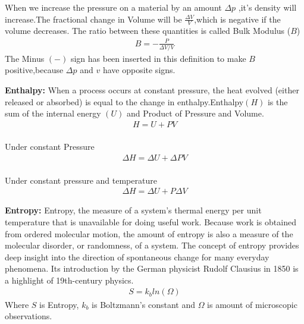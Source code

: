 \begin{phybox}{}
    {When we increase the pressure on a material by an amount $\Delta p$ ,it's density will increase.The fractional change in Volume will be $\frac{\Delta V}{V}$,which is negative if the volume decreases. The ratio between these quantities is called Bulk Modulus ($B$)
    \begin{align*}
        B = -\frac{P}{\Delta V / V}
    \end{align*}
    The Minus $(-)$ sign has been inserted in this definition to make $B$ positive,because $\Delta p$ and $v$ have opposite signs.}
\end{phybox}
\begin{chembox}{}
    \textbf{Enthalpy:}
   {When a process occurs at constant pressure, the heat evolved (either released or absorbed) is equal to the change in enthalpy.Enthalpy$(H)$ is the sum of the internal energy $(U)$ and Product of Pressure and Volume.}
    \begin{align*}
        H = U + PV
    \end{align*}\\
    Under constant Pressure
    \begin{align*}
        \Delta H = \Delta U + \Delta PV
    \end{align*}\\
    Under constant pressure and temperature\\
    \begin{align*}
        \Delta H = \Delta U + P \Delta V
    \end{align*}

    \textbf{Entropy:}
   {Entropy, the measure of a system’s thermal energy per unit temperature that is unavailable for doing useful work. Because work is obtained from ordered molecular motion, the amount of entropy is also a measure of the molecular disorder, or randomness, of a system. The concept of entropy provides deep insight into the direction of spontaneous change for many everyday phenomena. Its introduction by the German physicist Rudolf Clausius in 1850 is a highlight of 19th-century physics.}
   \begin{align*}
    S=k_b ln(\Omega)
   \end{align*}
   {Where $S$ is Entropy, $k_b$ is Boltzmann's constant and $\Omega$ is amount of microscopic observations.}
   \end{chembox}
